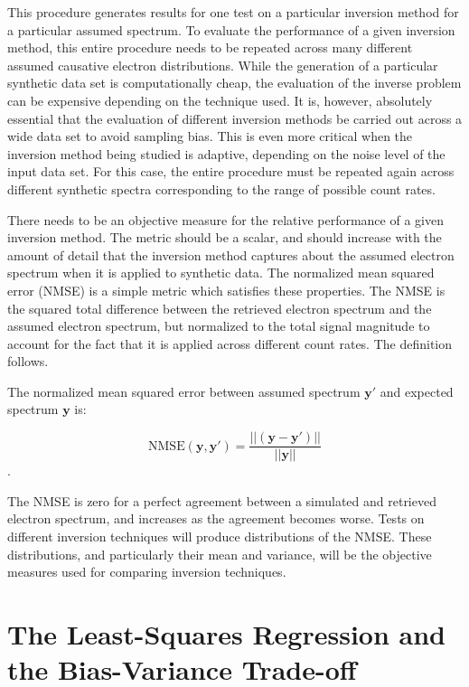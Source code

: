 This procedure generates results for one test on a particular inversion method for a particular assumed spectrum. To evaluate the performance of a given inversion method, this entire procedure needs to be repeated across many different assumed causative electron distributions. While the generation of a particular synthetic data set is computationally cheap, the evaluation of the inverse problem can be expensive depending on the technique used. It is, however, absolutely essential that the evaluation of different inversion methods be carried out across a wide data set to avoid sampling bias. This is even more critical when the inversion method being studied is adaptive, depending on the noise level of the input data set. For this case, the entire procedure must be repeated again across different synthetic spectra corresponding to the range of possible count rates.  

There needs to be an objective measure for the relative performance of a given inversion method. The metric should be a scalar, and should increase with the amount of detail that the inversion method captures about the assumed electron spectrum when it is applied to synthetic data. The normalized mean squared error (NMSE) is a simple metric which satisfies these properties. The NMSE is the squared total difference between the retrieved electron spectrum and the assumed electron spectrum, but normalized to the total signal magnitude to account for the fact that it is applied across different count rates. The definition follows.

\begin{definition}[NMSE]
The normalized mean squared error between assumed spectrum $\mathbf{y'}$ and expected spectrum $\mathbf{y}$ is: 

$$\mbox{NMSE}(\mathbf{y},\mathbf{y'}) = \frac{\vert \vert (\mathbf{y} - \mathbf{y'}) \vert \vert}{\vert \vert \mathbf{y} \vert \vert}$$.
\end{definition}

The NMSE is zero for a perfect agreement between a simulated and retrieved electron spectrum, and increases as the agreement becomes worse. Tests on different inversion techniques will produce distributions of the NMSE. These distributions, and particularly their mean and variance, will be the objective measures used for comparing inversion techniques. 

\section{The Least-Squares Regression and the Bias-Variance Trade-off}


